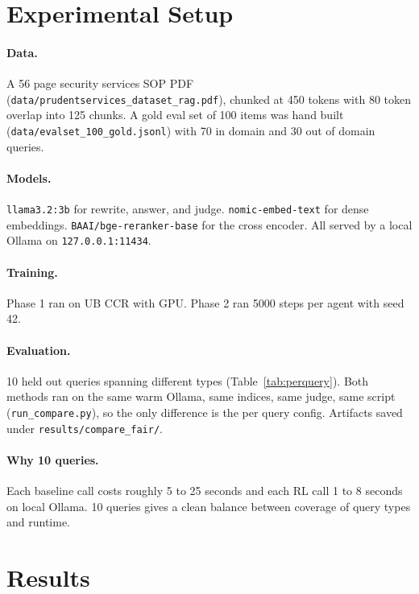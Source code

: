 \documentclass{article}
\begin{document}
\FloatBarrier
\section{Experimental Setup}

\paragraph{Data.} A 56 page security services SOP PDF (\texttt{data/prudentservices\_dataset\_rag.pdf}), chunked at 450 tokens with 80 token overlap into 125 chunks. A gold eval set of 100 items was hand built (\texttt{data/evalset\_100\_gold.jsonl}) with 70 in domain and 30 out of domain queries.

\paragraph{Models.} \texttt{llama3.2:3b} for rewrite, answer, and judge. \texttt{nomic-embed-text} for dense embeddings. \texttt{BAAI/bge-reranker-base} for the cross encoder. All served by a local Ollama on \texttt{127.0.0.1:11434}.

\paragraph{Training.} Phase 1 ran on UB CCR with GPU. Phase 2 ran 5000 steps per agent with seed 42.

\paragraph{Evaluation.} 10 held out queries spanning different types (Table~\ref{tab:perquery}). Both methods ran on the same warm Ollama, same indices, same judge, same script (\texttt{run\_compare.py}), so the only difference is the per query config. Artifacts saved under \texttt{results/compare\_fair/}.

\paragraph{Why 10 queries.} Each baseline call costs roughly 5 to 25 seconds and each RL call 1 to 8 seconds on local Ollama. 10 queries gives a clean balance between coverage of query types and runtime.

\section{Results}
\end{document}
